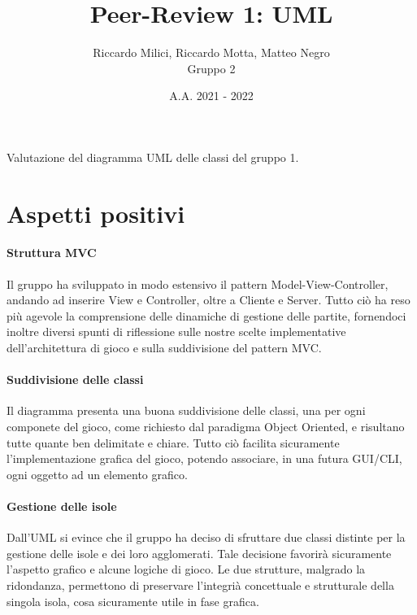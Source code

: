 \documentclass[a4paper]{article}
\title{\textbf{Peer-Review 1: UML}}
\author{Riccardo Milici, Riccardo Motta, Matteo Negro\\Gruppo 2}
\date{A.A. 2021 - 2022}
\begin{document}
	\maketitle
	
	Valutazione del diagramma UML delle classi del gruppo 1.
	
	\section{Aspetti positivi}
	
	
	\paragraph{Struttura MVC} Il gruppo ha sviluppato in modo estensivo il pattern Model-View-Controller, andando ad inserire View e Controller, oltre a Cliente e Server. Tutto ciò ha reso più agevole la comprensione delle dinamiche di gestione delle partite, fornendoci inoltre diversi spunti di riflessione sulle nostre scelte implementative dell'architettura di gioco e sulla suddivisione del pattern MVC.
	
	\paragraph{Suddivisione delle classi} Il diagramma presenta una buona suddivisione delle classi, una per ogni componete del gioco, come richiesto dal paradigma Object Oriented, e risultano tutte quante ben delimitate e chiare. Tutto ciò facilita sicuramente l'implementazione grafica del gioco, potendo associare, in una futura GUI/CLI, ogni oggetto ad un elemento grafico.  
	
	\paragraph{Gestione delle isole} Dall'UML si evince che il gruppo ha deciso di sfruttare due classi distinte per la gestione delle isole e dei loro agglomerati. Tale decisione favorirà sicuramente l'aspetto grafico e alcune logiche di gioco. Le due strutture, malgrado la ridondanza, permettono di preservare l'integrià concettuale e strutturale della singola isola, cosa sicuramente utile in fase grafica. 
	
\end{document}
